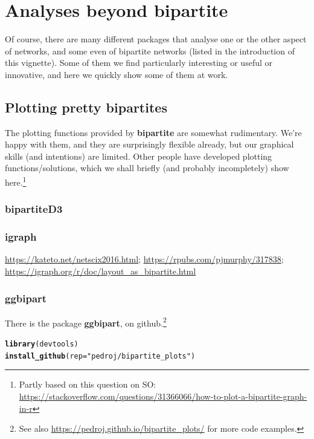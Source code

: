 \documentclass[a4paper, 11pt]{article}\usepackage[]{graphicx}\usepackage[dvipsnames]{xcolor}
\makeatletter
\newcommand{\hlstr}[1]{\textcolor[rgb]{0.192,0.494,0.8}{#1}}%
\newcommand{\hlstd}[1]{\textcolor[rgb]{0.345,0.345,0.345}{#1}}%
\newcommand{\hlkwc}[1]{\textcolor[rgb]{0.333,0.667,0.333}{#1}}%
\newcommand{\hlkwd}[1]{\textcolor[rgb]{0.737,0.353,0.396}{\textbf{#1}}}%
\newenvironment{kframe}{%
 \def\at@end@of@kframe{}%
 \ifinner\ifhmode%
  \def\at@end@of@kframe{\end{minipage}}%
  \begin{minipage}{\columnwidth}%
 \fi\fi%
 \def\FrameCommand##1{\hskip\@totalleftmargin \hskip-\fboxsep
 \colorbox{shadecolor}{##1}\hskip-\fboxsep
     \hskip-\linewidth \hskip-\@totalleftmargin \hskip\columnwidth}%
 \MakeFramed {\advance\hsize-\width
   \@totalleftmargin\z@ \linewidth\hsize
   \@setminipage}}%
 {\par\unskip\endMakeFramed%
 \at@end@of@kframe}
\newenvironment{knitrout}{}{} %
\newcommand{\package}[1]{\textbf{#1}}
\makeatother
\begin{document}
\section{Analyses beyond \package{bipartite}}%
Of course, there are many different packages that analyse one or the other aspect of networks, and some even of bipartite networks (listed in the introduction of this vignette). Some of them we find particularly interesting or useful or innovative, and here we quickly show some of them at work.

\subsection{Plotting pretty bipartites}
The plotting functions provided by \package{bipartite} are somewhat rudimentary. We're happy with them, and they are surprisingly flexible already, but our graphical skills (and intentions) are limited. Other people have developed plotting functions/solutions, which we shall briefly (and probably incompletely) show here.\footnote{Partly based on this question on SO: \url{https://stackoverflow.com/questions/31366066/how-to-plot-a-bipartite-graph-in-r}}

\subsubsection{\package{bipartiteD3}}

\subsubsection{\package{igraph}}
\url{https://kateto.net/netscix2016.html}; \url{https://rpubs.com/pjmurphy/317838}; \url{https://igraph.org/r/doc/layout_as_bipartite.html}

\subsubsection{\package{ggbipart}}
There is the package \package{ggbipart}, on github.\footnote{See also \url{https://pedroj.github.io/bipartite_plots/} for more code examples.}
\begin{knitrout}
\color{fgcolor}\begin{kframe}
\begin{alltt}
\hlkwd{library}\hlstd{(devtools)}
\hlkwd{install_github}\hlstd{(}\hlkwc{rep}\hlstd{=}\hlstr{"pedroj/bipartite_plots"}\hlstd{)}
\end{alltt}
\end{kframe}
\end{knitrout}
\end{document}
